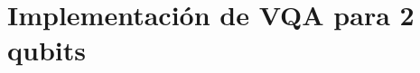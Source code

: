 \documentclass[11pt, spanish, letterpage]{report} %
\newcommand{\1}{\mathbb{1}}
\newcounter{problem}[section]
\begin{document}
\section{Implementación de VQA para 2 qubits}



\end{document}
